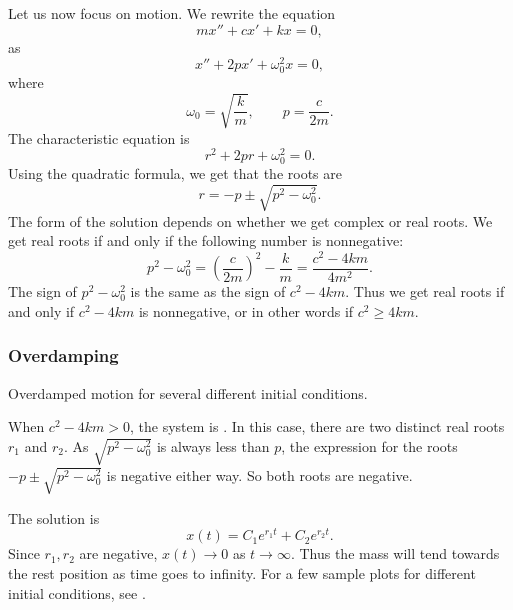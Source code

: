 Let us now focus on  motion.  We rewrite the equation
\begin{equation*}
m x'' + c x' + kx = 0,
\end{equation*}
as
\begin{equation*}
x'' + 2p x' + \omega_0^2 x = 0,
\end{equation*}
where
\begin{equation*}
\omega_0 = \sqrt{\frac{k}{m}}, \qquad p = \frac{c}{2m} .
\end{equation*}
The characteristic equation is
\begin{equation*}
r^2 + 2 pr + \omega_0^2 = 0 .
\end{equation*}
Using the quadratic formula, we get that the roots are
\begin{equation*}
r = -p \pm \sqrt{p^2 - \omega_0^2} .
\end{equation*}
The form of the solution depends on whether we get complex or real roots.
We get real roots if and only if the following number is nonnegative:
\begin{equation*}
p^2 - \omega_0^2 = {\left( \frac{c}{2m} \right)}^2 - \frac{k}{m}
= \frac{c^2 - 4km}{4m^2} .
\end{equation*}
The sign of $p^2-\omega_0^2$ is the same as the sign of
$c^2 - 4km$.  Thus we get real roots if and only if $c^2-4km$ is
nonnegative, or in other words if $c^2 \geq 4km$.

\subsubsection{Overdamping}

\begin{mywrapfig}[15]{3.25in}
\capstart
{}
\caption{Overdamped motion for several different initial conditions.\label{mv:overdampedfig}}
\end{mywrapfig}
%
%

When
$c^2 - 4km > 0$, the system is \emph{}.  In this case,
there are two distinct real roots $r_1$ and $r_2$.
As $\sqrt{p^2 - \omega_0^2}$ is always less than $p$,
the expression for the roots
$-p \pm \sqrt{p^2 - \omega_0^2}$ is negative either way.
So both roots are negative.


The solution is
\begin{equation*}
x(t) = C_1 e^{r_1 t} + C_2 e^{r_2 t} .
\end{equation*}
Since $r_1, r_2$ are negative, $x(t) \to 0$ as $t \to \infty$.
Thus the mass will tend towards the rest position as
time goes to infinity.  For a few sample plots for different initial
conditions, see .

